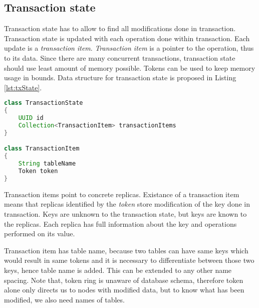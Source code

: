 \subsection{Transaction state}
Transaction state has to allow to find all modifications done in transaction. Transaction state is updated with each operation done within transaction. Each update is a \emph{transaction item}. \emph{Transaction item} is a pointer to the operation, thus to its data. Since there are many concurrent transactions, transaction state should use least amount of memory possible. Tokens can be used to keep memory usage in bounds. Data structure for transaction state is proposed in Listing \ref{lst:txState}.

\begin{lstlisting}[language=Java,style=outcode,label={lst:txState},caption={Transaction State data structure}]
class TransactionState
{
    UUID id
    Collection<TransactionItem> transactionItems    
}

class TransactionItem
{
    String tableName
    Token token
}
\end{lstlisting}






Transaction items point to concrete replicas. Existance of a transaction item means that replicas identified by the \emph{token} store modification of the key done in transaction. Keys are unknown to the transaction state, but keys are known to the replicas. Each replica has full information about the key and operations performed on its value. 

Transaction item has table name, because two tables can have same keys which would result in same tokens and it is necessary to differentiate between those two keys, hence table name is added. This can be extended to any other name spacing. Note that, token ring is unaware of database schema, therefore token alone only directs us to nodes with modified data, but to know what has been modified, we also need names of tables.

